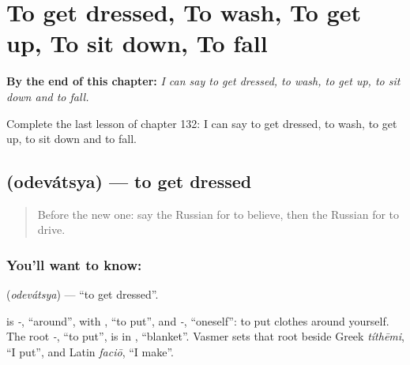 
\chapter{To get dressed, To wash, To get up, To sit down, To fall}
\label{ch:ru-to-get-dressed-to-wash-to-get-up-to-sit-down-to-fall}

\begin{chapteropening}
\textbf{By the end of this chapter:} \emph{I can say to get dressed, to wash, to get up, to sit down and to fall.}

Complete the last lesson of chapter 132: I can say to get dressed, to wash, to get up, to sit down and to fall.
\end{chapteropening}

\section[\texorpdfstring{\ru{одеваться} (odevátsya)}{одеваться (odevátsya)}]{ (odevátsya) — to get dressed}

\label{lesson:RU-C132-to-get-dressed}



\begin{quote}
Before the new one: say the Russian for to believe, then the Russian for to drive.
\end{quote}

\subsection*{You'll want to know: }
\textbf{} (\emph{odevátsya}) — \textquotedblleft{}to get dressed\textquotedblright{}.

\begin{cousinweb}
\textbf{} is \emph{-}, \textquotedblleft{}around\textquotedblright{}, with \emph{}, \textquotedblleft{}to put\textquotedblright{}, and \emph{-}, \textquotedblleft{}oneself\textquotedblright{}: to put clothes around yourself. The root \emph{-}, \textquotedblleft{}to put\textquotedblright{}, is in \emph{}, \textquotedblleft{}blanket\textquotedblright{}. Vasmer sets that root beside Greek \emph{títhēmi}, \textquotedblleft{}I put\textquotedblright{}, and Latin \emph{faciō}, \textquotedblleft{}I make\textquotedblright{}.
\end{cousinweb}

